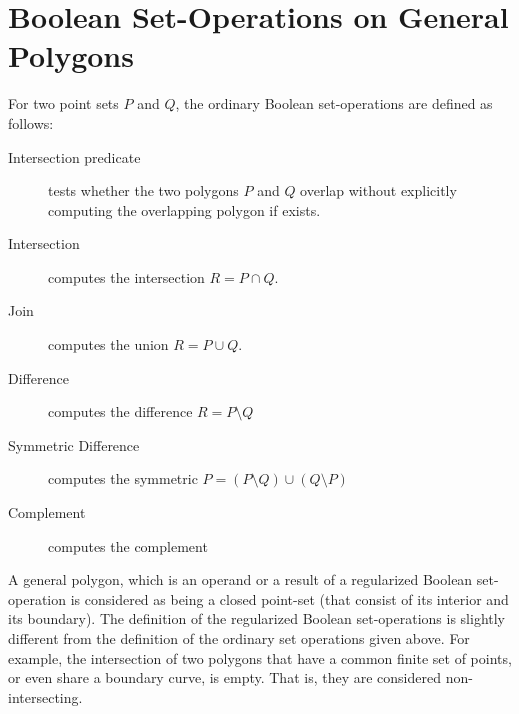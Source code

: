 \section{Boolean Set-Operations on General Polygons}
\label{bobs_sec:bops}
For two point sets $P$ and $Q$, the ordinary Boolean set-operations are
defined as follows:
\begin{description}
\item [Intersection predicate] tests whether the two polygons $P$ and $Q$
  overlap without explicitly computing the overlapping polygon if exists.
\item[Intersection] computes the intersection $R = P \cap Q$.
\item[Join] computes the union $R = P \cup Q$.
\item [Difference] computes the difference $R = P \setminus Q$ 
\item [Symmetric Difference] computes the symmetric
 $P = (P \setminus Q) \cup (Q \setminus P)$
\item[Complement] computes the complement
\end{description}

A general polygon, which is an operand or a result of a regularized
Boolean set-operation is considered as being a closed point-set (that
consist of its interior and its boundary). The definition of the regularized 
Boolean set-operations is slightly different from the definition of the 
ordinary set operations given above. For example, the intersection of
two polygons that have a common finite set of points, or even 
share a boundary curve, is empty. That is, they are considered 
non-intersecting.

